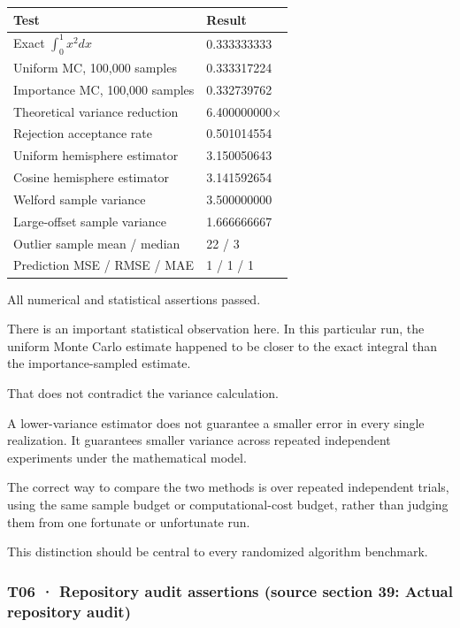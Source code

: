 {\def\LTcaptype{none} %
\begin{longtable}[]{@{}ll@{}}
\toprule\noalign{}
Test & Result \\
\midrule\noalign{}
\endhead
\bottomrule\noalign{}
\endlastfoot
Exact \(\int_0^1x^2dx\) & 0.333333333 \\
Uniform MC, 100,000 samples & 0.333317224 \\
Importance MC, 100,000 samples & 0.332739762 \\
Theoretical variance reduction & 6.400000000× \\
Rejection acceptance rate & 0.501014554 \\
Uniform hemisphere estimator & 3.150050643 \\
Cosine hemisphere estimator & 3.141592654 \\
Welford sample variance & 3.500000000 \\
Large-offset sample variance & 1.666666667 \\
Outlier sample mean / median & 22 / 3 \\
Prediction MSE / RMSE / MAE & 1 / 1 / 1 \\
\end{longtable}
}

All numerical and statistical assertions passed.

There is an important statistical observation here. In this particular run, the uniform Monte Carlo estimate happened to be closer to the exact integral than the importance-sampled estimate.

That does not contradict the variance calculation.

A lower-variance estimator does not guarantee a smaller error in every single realization. It guarantees smaller variance across repeated independent experiments under the mathematical model.

The correct way to compare the two methods is over repeated independent trials, using the same sample budget or computational-cost budget, rather than judging them from one fortunate or unfortunate run.

This distinction should be central to every randomized algorithm benchmark.

\subsubsection{T06 · Repository audit assertions (source section 39: Actual repository audit)}\label{02-foundations-ii-ch039-t06-repository-audit-assertions-source-section-39-actual-repository-audit}


